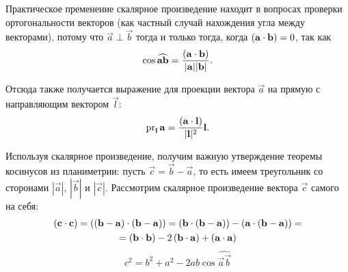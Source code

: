 Практическое пременение скалярное произведение находит в вопросах проверки ортогональности векторов (как частный случай нахождения угла между векторами), потому что $\vec{a} \perp \vec{b}$ тогда и только тогда, когда $\left(\mathbf{a} \cdot \mathbf{b}\right) = 0$, так как
\begin{equation}
    \cos \widehat{\mathbf{a}\mathbf{b}} = \frac{\left(\mathbf{a} \cdot \mathbf{b}\right)}{|\mathbf{a}||\mathbf{b}|}.
\end{equation}

Отсюда также получается выражение для проекции вектора $\vec{a}$ на прямую с направляющим вектором $\vec{l}$:
\begin{equation}
    \operatorname{pr}_{\mathbf{l}} \mathbf{a} = \frac{\left(\mathbf{a} \cdot \mathbf{l}\right)}{|\mathbf{l}|^2} \mathbf{l}.
\end{equation}

Используя скалярное произведение, получим важную утверждение теоремы косинусов из планиметрии: пусть $\vec{c} = \vec{b} - \vec{a}$, то есть имеем треугольник со сторонами $|\vec{a}|$, $|\vec{b}|$ и $|\vec{c}|$. Рассмотрим скалярное произведение вектора $\vec{c}$ самого на себя:
\begin{multline}
    \left(\mathbf{c} \cdot \mathbf{c}\right) = \left(\mathbf{(b - a)} \cdot \mathbf{(b - a)}\right) = \left(\mathbf{b} \cdot \mathbf{(b-a)}\right) - \left(\mathbf{a} \cdot \mathbf{(b - a)}\right) = \\
    = \left(\mathbf{b} \cdot \mathbf{b}\right) - 2\left(\mathbf{b} \cdot \mathbf{a}\right) + \left(\mathbf{a} \cdot \mathbf{a}\right)
\end{multline}
\begin{equation}
    c^2 = b^2 + a^2 - 2ab\cos \widehat{\vec{a}\vec{b}}
\end{equation}
